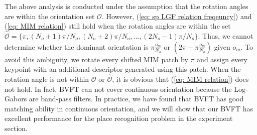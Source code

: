 \documentclass[letterpaper, 10 pt, journal, twoside]{IEEEtran}
\begin{document}
The above analysis is conducted under the assumption that the rotation angles are within the orientation set $\mathcal{O}$. However, (\ref{eq: sp LGF relation freqeuncy}) and (\ref{eq: MIM relation}) still hold when the rotation angles are within the set $\mathcal{\hat{O}}=\{\pi, (N_o+1)\pi/N_o,(N_o+2)\pi/N_o,...,(2N_o-1)\pi/N_o\}$. Thus, we cannot determine whether the dominant orientation is $\pi\frac{o_{m}}{N_o}$ or $(2\pi-\pi\frac{o_{m}}{N_o})$ given $o_{m}$. To avoid this ambiguity, we rotate every shifted MIM patch by $\pi$ and assign every keypoint with an additional descriptor generated using this patch. When the rotation angle is not within $\mathcal{O}$ or $\mathcal{\hat{O}}$, it is obvious that (\ref{eq: MIM relation}) does not hold. In fact, BVFT can not cover continuous orientation because the Log-Gabors are band-pass filters. In practice, we have found that BVFT has good matching ability in continuous orientation, and we will show that our BVFT has excellent performance for the place recognition problem in the experiment section.  



\end{document}
